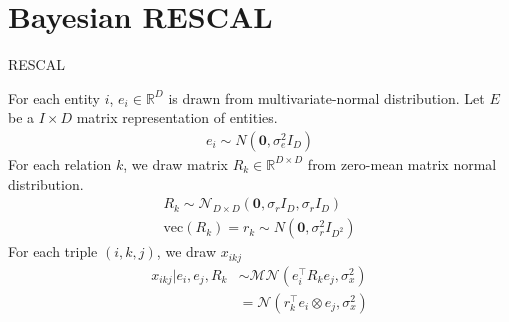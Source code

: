 \section{Bayesian RESCAL}

RESCAL \cite{nickel2011three}

For each entity $i$, $e_i \in \mathbb{R}^{D}$ is drawn from multivariate-normal distribution. Let $E$ be a $I \times D$ matrix representation of entities.
\begin{align}
\label{eqn:entity_gen}
e_i \sim {N}(\mathbf{0}, \sigma_e^2{I}_D)
\end{align}
For each relation $k$, we draw matrix $R_k \in \mathbb{R}^{D\times D}$ from zero-mean matrix normal distribution.
\begin{align}
\label{eqn:relation_gen}
R_k \sim \mathcal{N}_{D \times D}(\mathbf{0}, \sigma_r{I}_D, \sigma_r{I}_D) \\
\text{vec}(R_k) = r_k \sim N(\mathbf{0}, \sigma_r^2 I_{D^2})
\end{align}
For each triple $(i,k,j)$, we draw $x_{ikj}$
\begin{align}
\label{eqn:triple_gen}
x_{ikj} |e_i, e_j, R_k &\sim \mathcal{MN}(e_i^{\top} R_k e_j, \sigma_x^2)\\
& = \mathcal{N}(r_k^{\top} e_i \otimes e_j, \sigma_x^2)
\end{align}






